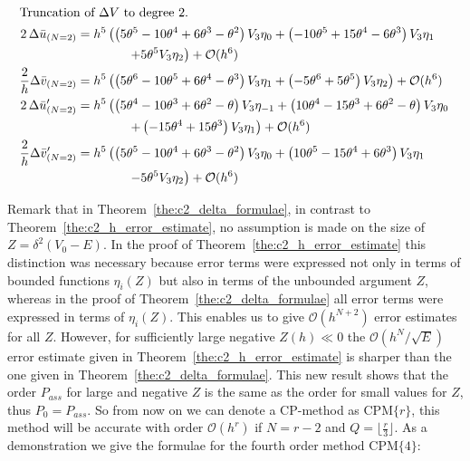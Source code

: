 \begin{align*}
    \intertext{Truncation of $\Delta V$ to degree $2$.}
    2\,\Delta \bar{u}_{(N=2)}          & = h^{5}\left(\left(5 \theta^{5} - 10 \theta^{4} + 6 \theta^{3} - \theta^{2}\right) V_{3} \eta_{0} + \left(-10 \theta^{5} + 15 \theta^{4} - 6 \theta^{3}\right) V_{3} \eta_{1} \right.      \\
                                       & \qquad\qquad \left.+5 \theta^{5} V_{3} \eta_{2}\right) + \mathcal{O}(h^{6})                                                                                                                \\
    \frac{2}{h}\Delta \bar{v}_{(N=2)}  & = h^{5}\left(\left(5 \theta^{6} - 10 \theta^{5} + 6 \theta^{4} - \theta^{3}\right) V_{3} \eta_{1} + \left(-5 \theta^{6} + 5 \theta^{5}\right) V_{3} \eta_{2}\right) + \mathcal{O}(h^{6})   \\
    2\,\Delta \bar{u}'_{(N=2)}         & = h^{5}\left(\left(5 \theta^{4} - 10 \theta^{3} + 6 \theta^{2} - \theta\right) V_{3} \eta_{-1} + \left(10 \theta^{4} - 15 \theta^{3} + 6 \theta^{2} - \theta\right) V_{3} \eta_{0} \right. \\
                                       & \qquad\qquad \left. + \left(-15 \theta^{4} + 15 \theta^{3}\right) V_{3} \eta_{1}\right) + \mathcal{O}(h^{6})                                                                               \\
    \frac{2}{h}\Delta \bar{v}'_{(N=2)} & = h^{5}\left(\left(5 \theta^{5} - 10 \theta^{4} + 6 \theta^{3} - \theta^{2}\right) V_{3} \eta_{0} + \left(10 \theta^{5} - 15 \theta^{4} + 6 \theta^{3}\right) V_{3} \eta_{1} \right.       \\
                                       & \qquad\qquad \left. -5 \theta^{5} V_{3} \eta_{2}\right) + \mathcal{O}(h^{6})
\end{align*}

Remark that in Theorem~\ref{the:c2_delta_formulae}, in contrast to Theorem~\ref{the:c2_h_error_estimate}, no assumption is made on the size of $Z=\delta^2 (V_0-E)$. In the proof of Theorem~\ref{the:c2_h_error_estimate} this distinction was necessary because error terms were expressed
not only in terms of bounded functions $\eta_i(Z)$ but also in terms of the unbounded argument $Z$, whereas in the proof of
Theorem~\ref{the:c2_delta_formulae} all error terms were expressed in terms of $\eta_i(Z)$. This enables us to give $\mathcal{O}(h^{N+2})$ error estimates for all $Z$. However, for sufficiently large negative $Z(h) \ll 0$ the $\mathcal{O}({h^N}/{\sqrt{E}})$ error estimate given in Theorem~\ref{the:c2_h_error_estimate} is sharper than the one given in Theorem~\ref{the:c2_delta_formulae}. This new result shows that the order $P_{ass}$ for large and negative $Z$ is the same as the order for small values for $Z$, thus $P_0 = P_{ass}$. So from now on we can denote a CP-method as $\text{CPM}\{r\}$, this method will be accurate with order $\mathcal{O}(h^r)$ if $N=r-2$ and $Q=\lfloor \frac{r}{3} \rfloor$. As a demonstration we give the formulae for the fourth order method $\text{CPM}\{4\}$:

